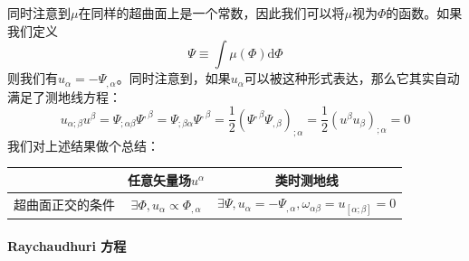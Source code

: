 \documentclass[hyperref, UTF8, a4paper]{ctexart}
\begin{document}
同时注意到$\mu $在同样的超曲面上是一个常数，因此我们可以将$\mu $视为$\Phi $的函数。如果我们定义
\begin{equation*}
	\Psi \equiv \int \mu ( \Phi )\mathrm{d} \Phi 
\end{equation*}
则我们有$u_{\alpha } =-\Psi _{,\alpha }$。同时注意到，如果$u_{\alpha }$可以被这种形式表达，那么它其实自动满足了测地线方程：
\begin{equation*}
	u_{\alpha ;\beta } u^{\beta } =\Psi _{;\alpha \beta } \Psi ^{,\beta } =\Psi _{;\beta \alpha } \Psi ^{,\beta } =\frac{1}{2} (\Psi ^{,\beta } \Psi _{,\beta } )_{;\alpha } =\frac{1}{2} (u^{\beta } u_{\beta } )_{;\alpha } =0
\end{equation*}
我们对上述结果做个总结：
\begin{center}
	\begin{tabular}{|c|c|c|}
		\hline
		& 任意矢量场$u^{\alpha }$ & 类时测地线 \\
		\hline
		超曲面正交的条件 & $\exists \Phi ,u_{\alpha } \varpropto \Phi _{,\alpha }$ & $\exists \Psi ,u_{\alpha } =-\Psi _{,\alpha } ,\omega _{\alpha \beta } =u_{[ \alpha ;\beta ]} =0$ \\
		\hline
	\end{tabular}
\end{center}

\paragraph{Raychaudhuri 方程}
\end{document}
